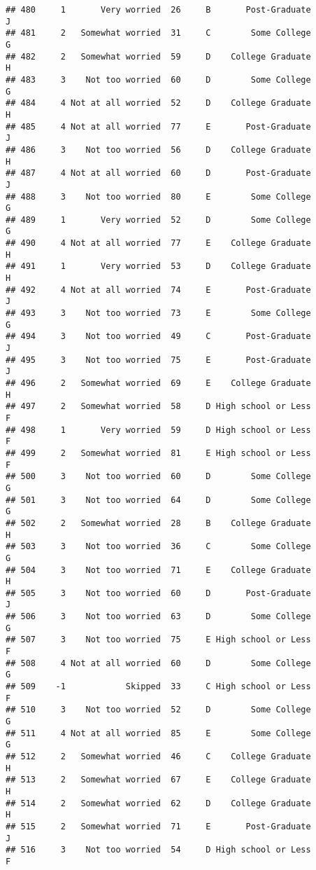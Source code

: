 \documentclass[
]{article}
\begin{document}
\begin{verbatim}
## 480     1       Very worried  26     B       Post-Graduate         J
## 481     2   Somewhat worried  31     C        Some College         G
## 482     2   Somewhat worried  59     D    College Graduate         H
## 483     3    Not too worried  60     D        Some College         G
## 484     4 Not at all worried  52     D    College Graduate         H
## 485     4 Not at all worried  77     E       Post-Graduate         J
## 486     3    Not too worried  56     D    College Graduate         H
## 487     4 Not at all worried  60     D       Post-Graduate         J
## 488     3    Not too worried  80     E        Some College         G
## 489     1       Very worried  52     D        Some College         G
## 490     4 Not at all worried  77     E    College Graduate         H
## 491     1       Very worried  53     D    College Graduate         H
## 492     4 Not at all worried  74     E       Post-Graduate         J
## 493     3    Not too worried  73     E        Some College         G
## 494     3    Not too worried  49     C       Post-Graduate         J
## 495     3    Not too worried  75     E       Post-Graduate         J
## 496     2   Somewhat worried  69     E    College Graduate         H
## 497     2   Somewhat worried  58     D High school or Less         F
## 498     1       Very worried  59     D High school or Less         F
## 499     2   Somewhat worried  81     E High school or Less         F
## 500     3    Not too worried  60     D        Some College         G
## 501     3    Not too worried  64     D        Some College         G
## 502     2   Somewhat worried  28     B    College Graduate         H
## 503     3    Not too worried  36     C        Some College         G
## 504     3    Not too worried  71     E    College Graduate         H
## 505     3    Not too worried  60     D       Post-Graduate         J
## 506     3    Not too worried  63     D        Some College         G
## 507     3    Not too worried  75     E High school or Less         F
## 508     4 Not at all worried  60     D        Some College         G
## 509    -1            Skipped  33     C High school or Less         F
## 510     3    Not too worried  52     D        Some College         G
## 511     4 Not at all worried  85     E        Some College         G
## 512     2   Somewhat worried  46     C    College Graduate         H
## 513     2   Somewhat worried  67     E    College Graduate         H
## 514     2   Somewhat worried  62     D    College Graduate         H
## 515     2   Somewhat worried  71     E       Post-Graduate         J
## 516     3    Not too worried  54     D High school or Less         F

\end{verbatim}
\end{document}
